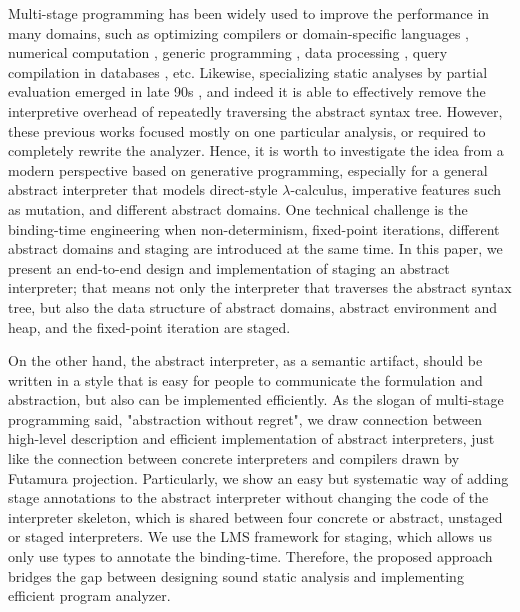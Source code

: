 Multi-stage programming has been widely used to improve the performance in many
domains, such as optimizing compilers or domain-specific languages
\cite{DBLP:conf/pldi/RompfSBLCO14, DBLP:conf/snapl/RompfBLSJAOSKDK15,
DBLP:journals/tecs/SujeethBLRCOO14, DBLP:conf/gpce/SujeethGBLROO13,
DBLP:journals/jfp/CaretteKS09}, numerical computation \cite{PGL-038,
DBLP:conf/pepm/AktemurKKS13}, generic programming
\cite{DBLP:journals/pacmpl/Yallop17, Ofenbeck:2017:SGP:3136040.3136060}, data
processing \cite{DBLP:conf/oopsla/JonnalageddaCSRO14,
DBLP:conf/popl/KiselyovBPS17}, query compilation in databases
\cite{DBLP:conf/osdi/EssertelTDBOR18, DBLP:conf/sigmod/TahboubER18}, etc.
Likewise, specializing static analyses by partial evaluation emerged in late 90s
\cite{damian1999partial, amtoft1999partial, Boucher:1996:ACN:647473.727587,
ashley:practical}, and indeed it is able to effectively remove the interpretive
overhead of repeatedly traversing the abstract syntax tree. However, these
previous works focused mostly on one particular analysis, or required to
completely rewrite the analyzer. Hence, it is worth to investigate the idea from
a modern perspective based on generative programming, especially for a general
abstract interpreter that models direct-style $\lambda$-calculus, imperative
features such as mutation, and different abstract domains. One technical
challenge is the binding-time engineering when non-determinism, fixed-point
iterations, different abstract domains and staging are introduced at the same
time. In this paper, we present an end-to-end design and implementation of
staging an abstract interpreter; that means not only the interpreter that
traverses the abstract syntax tree, but also the data structure of abstract
domains, abstract environment and heap, and the fixed-point iteration are
staged.

On the other hand, the abstract interpreter, as a semantic artifact, should be
written in a style that is easy for people to communicate the formulation and
abstraction, but also can be implemented efficiently. As the slogan of
multi-stage programming said, "abstraction without regret", we draw connection
between high-level description and efficient implementation of abstract
interpreters, just like the connection between concrete interpreters and
compilers drawn by Futamura projection. Particularly, we show an easy but
systematic way of adding stage annotations to the abstract interpreter without
changing the code of the interpreter skeleton, which is shared between four concrete
or abstract, unstaged or staged interpreters. We use the LMS framework for staging,
which allows us only use types to annotate the binding-time. Therefore, the
proposed approach bridges the gap between designing sound static analysis and
implementing efficient program analyzer.

